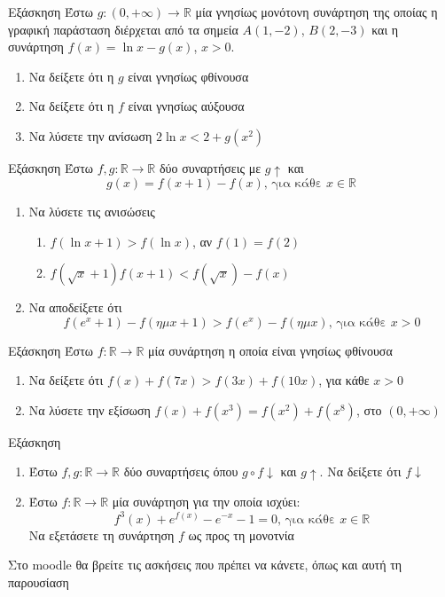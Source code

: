 \documentclass[greek]{beamer}
\begin{document}
\begin{frame}{Εξάσκηση}
      Έστω $g:(0,+\infty)\to\mathbb{R}$ μία γνησίως μονότονη συνάρτηση της οποίας η γραφική παράσταση διέρχεται από τα σημεία $Α(1,-2)$, $Β(2,-3)$ και η συνάρτηση $f(x)=\ln x-g(x)$, $x>0$.
      \begin{enumerate}
            \item Να δείξετε ότι η $g$ είναι γνησίως φθίνουσα \pause
            \item Να δείξετε ότι η $f$ είναι γνησίως αύξουσα \pause
            \item Να λύσετε την ανίσωση $2\ln x<2+g(x^2)$
      \end{enumerate}
\end{frame}

\begin{frame}{Εξάσκηση}
      Έστω $f,g:\mathbb{R}\to\mathbb{R}$ δύο συναρτήσεις με $g\uparrow$ και
      $$g(x)=f(x+1)-f(x)\text{, για κάθε } x\in\mathbb{R}$$
      \begin{enumerate}
            \item Να λύσετε τις ανισώσεις
                  \begin{enumerate}
                        \item $f(\ln x+1)>f(\ln x)$, αν $f(1)=f(2)$ \pause
                        \item $f(\sqrt{x}+1)f(x+1)<f(\sqrt{x})-f(x)$ \pause
                  \end{enumerate}
            \item Να αποδείξετε ότι
                  $$f(e^x+1)-f(ημ x+1)>f(e^x)-f(ημ x)\text{, για κάθε } x>0$$
      \end{enumerate}
\end{frame}

\begin{frame}{Εξάσκηση}
      Έστω $f:\mathbb{R}\to\mathbb{R}$ μία συνάρτηση η οποία είναι γνησίως φθίνουσα
      \begin{enumerate}
            \item Να δείξετε ότι $f(x)+f(7x)>f(3x)+f(10x)$, για κάθε $x>0$ \pause
            \item Να λύσετε την εξίσωση $f(x)+f(x^3)=f(x^2)+f(x^8)$, στο $(0,+\infty)$
      \end{enumerate}
\end{frame}

\begin{frame}{Εξάσκηση}

      \begin{enumerate}
            \item Έστω $f,g:\mathbb{R}\to\mathbb{R}$ δύο συναρτήσεις όπου $g\circ f \downarrow$ και $g\uparrow$. Να δείξετε ότι $f\downarrow$ \pause
            \item Έστω $f:\mathbb{R}\to\mathbb{R}$ μία συνάρτηση για την οποία ισχύει:
                  $$f^3(x)+e^{f(x)}-e^{-x}-1=0\text{, για κάθε } x\in\mathbb{R}$$
                  Να εξετάσετε τη συνάρτηση $f$ ως προς τη μονοτνία
      \end{enumerate}
\end{frame}

\begin{frame}
      Στο moodle θα βρείτε τις ασκήσεις που πρέπει να κάνετε, όπως και αυτή τη παρουσίαση
\end{frame}
\end{document}
